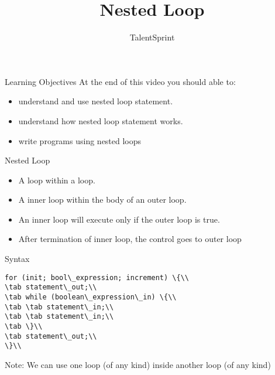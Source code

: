 \documentclass[aspectratio=169,14pt,usenames,dvipsnames]{beamer}
\title[Nested Loop]{Nested Loop}
\newcommand\tab[1][1cm]{\hspace*{#1}}
\begin{document}
{\1
\begin{frame} \vspace{35pt}

\subtitle{TalentSprint}
\maketitle
\end{frame}
}


\begin{frame}{Learning Objectives}
At the end of this video you should able to:
\begin{itemize}
\item understand and use nested loop statement.
\item understand how nested loop statement
works.
\item write programs using nested loops
\end{itemize}
\end{frame}


\begin{frame}{Nested Loop}
\begin{itemize}
    \item A loop within a loop.
    \item A inner loop within the body of an outer
loop.
\item An inner loop will execute only if the outer
loop is true.
\item After termination of inner loop, the control
goes to outer loop
\end{itemize}
\end{frame}



\begin{frame}{Syntax}
\begin{lstlisting}
for (init; bool\_expression; increment) \{\\
\tab statement\_out;\\
\tab while (boolean\_expression\_in) \{\\
\tab \tab statement\_in;\\
\tab \tab statement\_in;\\
\tab \}\\
\tab statement\_out;\\
\}\\
\end{lstlisting}
Note: We can use one loop (of any kind) inside
another loop (of any kind)
\end{frame}
\end{document}
